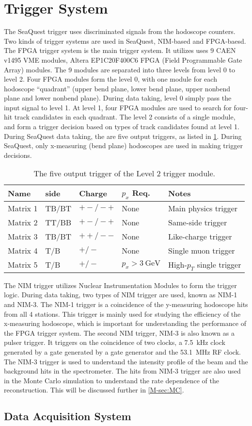 \documentclass[../main.tex]{subfiles}
\begin{document}
\section{Trigger System}
The SeaQuest trigger uses discriminated signals from the hodoscope counters.
Two kinds of trigger systems are used in SeaQuest, NIM-based and FPGA-baesd.
The FPGA trigger system is the main trigger system. It utilizes uses 9 CAEN
v1495 VME modules, Altera EP1C20F400C6 FPGA (Field Programmable Gate Array)
modules. The 9 modules are separated into three levels from level 0 to level
2. Four FPGA modules form the level 0, with one module for each hodoscope
``quadrant'' (upper bend plane, lower bend plane, upper nonbend plane and
lower nonbend plane). During data taking, level 0 simply pass the input signal
to level 1. At level 1, four FPGA modules are used to search for four-hit track
candidates in each quadrant. The level 2 consists of a single module, and form
a trigger decision based on types of track candidates found at level 1. During
SeaQuest data taking, the are five output triggers, as listed in \cref{tab:FPGA}.
During SeaQuest, only x-measuring (bend plane) hodoscopes are used in making
trigger decisions.
\begin{table}[h!]
	\centering
	\caption{The five output trigger of the Level 2 trigger module.}
	\label{tab:FPGA}
	\begin{tabular}{lllll}
		Name     & side  & Charge  & $p_x$ Req.         & Notes                     \\ \hline
		Matrix 1 & TB/BT & $+-/-+$ & None               & Main physics trigger      \\
		Matrix 2 & TT/BB & $+-/-+$ & None               & Same-side trigger         \\
		Matrix 3 & TB/BT & $++/--$ & None               & Like-charge trigger       \\
		Matrix 4 & T/B   & $+/-$   & None               & Single muon trigger       \\
		Matrix 5 & T/B   & $+/-$   & $p_x>\SI{3}{\GeV}$ & High-$p_T$ single trigger
	\end{tabular}
\end{table}

The NIM trigger utilizes Nuclear Instrumentation Modules to form the trigger
logic. During data taking, two types of NIM trigger are used, known as NIM-1
and NIM-3. The NIM-1 trigger is a coincidence of the y-measuring hodoscope hits
from all 4 stations. This trigger is mainly used for studying the efficiency
of the x-measuring hodoscope, which is important for understanding the performance
of the FPGA trigger system. The second NIM trigger, NIM-3 is also known as a
pulser trigger. It triggers on the coincidence of two clocks, a \SI{7.5}{\kHz}
clock generated by a gate generated by a gate generator and the \SI{53.1}{\MHz}
RF clock. The NIM-3 trigger is used to understand the intensity profile of the
beam and the background hits in the spectrometer. The hits from NIM-3 trigger
are also used in the Monte Carlo simulation to understand the rate dependence
of the reconstruction. This will be discussed further in \cref{M-sec:MC}.

\subsection{Data Acquisition System}


\ifSubfilesClassLoaded{ \printbibliography[heading=bibintoc,title={References}]}{}
\end{document}
